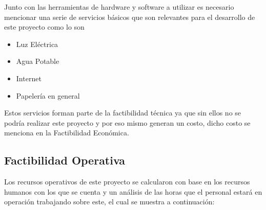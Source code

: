 \documentclass[12pt, a4paper, titlepage]{report}
\begin{document}
    		Junto con las herramientas de hardware y software a utilizar es necesario mencionar una serie de servicios b\'asicos que son relevantes para el desarrollo de este proyecto como lo son 
    		\begin{itemize}
    		    \item Luz Eléctrica
    		    \item Agua Potable
    		    \item Internet
    		    \item Papelería en general
    		\end{itemize}
    		Estos servicios forman parte de la factibilidad técnica ya que sin ellos no se podría realizar este proyecto y por eso mismo generan un costo, dicho costo se menciona en la Factibilidad Económica.
    		
    	    \subsection{Factibilidad Operativa}
    	    Los recursos operativos de este proyecto se calcularon con base en los recursos humanos con los que se cuenta y un análisis de las horas que el personal estará en operación trabajando sobre este, el cual se muestra a continuación:
    	    
\end{document}
